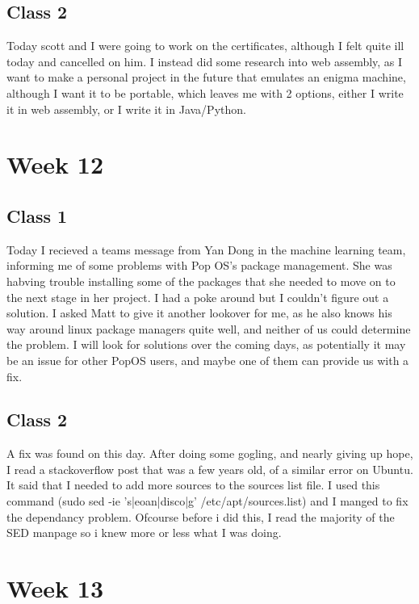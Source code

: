 \documentclass{article}
\begin{document}
\subsection{Class 2}
Today scott and I were going to work on the certificates, although I felt quite ill today and cancelled on him. I instead did some research into web assembly, as I 
want to make a personal project in the future that emulates an enigma machine, although I want it to be portable, which leaves me with 2 options, either I write
it in web assembly, or I write it in Java/Python. 

\section{Week 12}
\subsection{Class 1}
Today I recieved a teams message from Yan Dong in the machine learning team, informing me of some problems with Pop OS's package management. She was habving trouble 
installing some of the packages that she needed to move on to the next stage in her project. I had a poke around but I couldn't figure out a solution. I asked Matt
to give it another lookover for me, as he also knows his way around linux package managers quite well, and neither of us could determine the problem. I will look
for solutions over the coming days, as potentially it may be an issue for other PopOS users, and maybe one of them can provide us with a fix.

\subsection{Class 2}
A fix was found on this day. After doing some gogling, and nearly giving up hope, I read a stackoverflow post that was a few years old, of a similar error on
Ubuntu. It said that I needed to add more sources to the sources list file. I used this command (sudo sed -ie 's|eoan|disco|g' /etc/apt/sources.list) and I manged to
fix the dependancy problem. Ofcourse before i did this, I read the majority of the SED manpage so i knew more or less what I was doing.

\section{Week 13}
\end{document}
